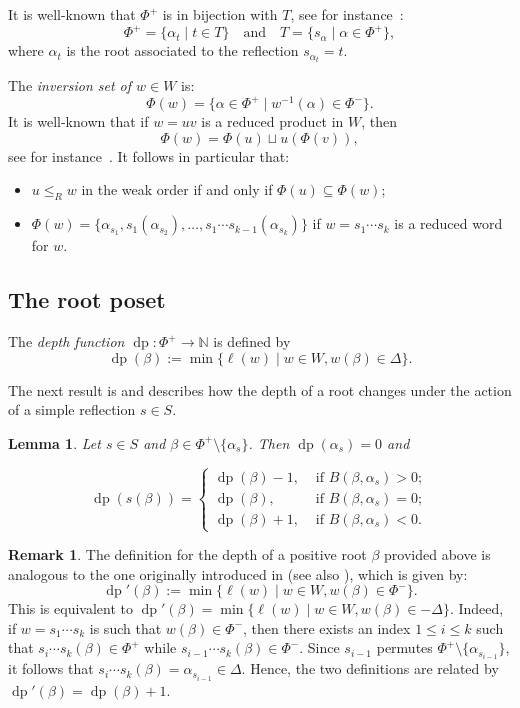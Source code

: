 \documentclass{amsart}
\newtheorem{Lemma}[Theorem]{Lemma}
\theoremstyle{definition}
\newtheorem{Remark}[Theorem]{Remark}
\newcommand{\dep}{\operatorname{dp}}
\begin{document}
It is well-known that $\Phi^+$ is in bijection with $T$, see for instance~\cite[Proposition 4.4.5]{BB}:
$$
\Phi^+=\{\alpha_t\mid t \in T\}\quad\textrm{and}\quad T=\{s_\alpha \mid \alpha\in \Phi^+\},
$$
where $\alpha_t$ is the root associated to the reflection $s_{\alpha_t}=t$. 


The \textit{inversion set of $w\in W$} is:
$$
\Phi(w)=\{\alpha\in \Phi^+ \mid w^{-1}(\alpha)\in\Phi^-\}.
$$
It is well-known that if $w=uv$ is a reduced product in $W$, then
$$
\Phi(w)=\Phi(u)\sqcup u(\Phi(v)),
$$
see for instance~\cite[Proposition~2.2]{DFHM24}. It follows in particular that:
\begin{itemize}
\item $u\leq_R w$ in the weak order if and only if $\Phi(u)\subseteq \Phi(w)$;
\item $\Phi(w)=\{\alpha_{s_1},s_1(\alpha_{s_2}),\dots, s_1\cdots s_{k-1}(\alpha_{s_k})\}$ if $w=s_1\cdots s_k$ is a reduced word for $w$. 
\end{itemize}


\subsection{The root poset}\label{ss:RootPoset} The \textit{depth function $\dep:\Phi^+\to \mathbb N$}  is defined by
$$
    \dep(\beta):=\min\{\ell(w)\mid w\in W, w(\beta)\in \Delta\}.
$$




The next result is \cite[Lemma~4.6.2]{BB} and describes how the depth of a root changes under the action of a simple reflection $s\in S$. 

\begin{Lemma}\label{lem:depth}
Let $s\in S$ and $\beta\in \Phi^+\setminus \{\alpha_s\}$. Then $\dep(\alpha_s)=0$ and

\begin{equation}\label{eq:depth}
\dep(s(\beta))=\begin{cases}
    \dep(\beta)-1, &\mbox{ if } B(\beta, \alpha_s)>0;\\
    \dep(\beta), &\mbox{ if } B(\beta, \alpha_s)=0;\\
    \dep(\beta)+1, &\mbox{ if } B(\beta, \alpha_s)<0.
\end{cases}
\end{equation}
\end{Lemma}


\begin{Remark} 
The definition for the depth of a positive root $\beta$ provided above is analogous to the one originally introduced in \cite[Definition 1.5]{BH} (see also \cite[Definition 4.6.1]{BB}), which is given by: 
$$
\dep'(\beta):=\min\{\ell(w)\mid w\in W, w(\beta)\in \Phi^-\}.
$$
This is equivalent to $\dep'(\beta)=\min\{\ell(w)\mid w\in W, w(\beta)\in -\Delta\}$. Indeed, if $w=s_1\cdots s_k$ is such that $w(\beta)\in \Phi^-$, then there exists an index $1\leq i\leq k$ such that $s_i\cdots s_k(\beta) \in \Phi^+$ while $s_{i-1}\cdots s_k(\beta) \in \Phi^-$.  Since $s_{i-1}$ permutes $\Phi^+\setminus \{\alpha_{s_{i-1}}\}$, it follows that $s_i\cdots s_k(\beta)=\alpha_{s_{i-1}}\in \Delta$. Hence, the two definitions are related by $\dep'(\beta)=\dep(\beta)+1$.
\end{Remark} 
\end{document}
